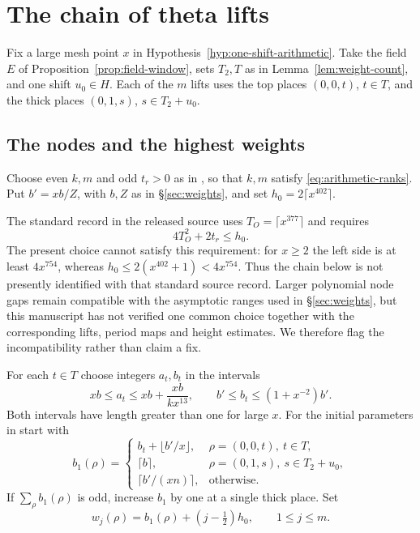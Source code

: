 \section{The chain of theta lifts}\label{sec:theta-chain}

Fix a large mesh point $x$ in Hypothesis~\ref{hyp:one-shift-arithmetic}.
Take the field $E$ of Proposition~\ref{prop:field-window}, sets $T_2,T$
as in Lemma~\ref{lem:weight-count}, and one shift $u_0\in H$.
Each of the $m$ lifts uses the top places $(0,0,t)$,
$t\in T$, and the thick places $(0,1,s)$, $s\in T_2+u_0$.

\subsection{The nodes and the highest weights}

Choose even $k,m$ and odd $t_r>0$ as in
\citep[Proposition~5.15]{adriazola-grh}, so that $k,m$ satisfy
\eqref{eq:arithmetic-ranks}. Put $b'=xb/Z$, with $b,Z$ as in
\S\ref{sec:weights}, and set $h_0=2\lceil x^{402}\rceil$.

\begin{remark}\label{rem:spacing-compatibility}
The standard record in the released source uses
$T_O=\lceil x^{377}\rceil$ and requires
\[
                         4T_O^2+2t_r\le h_0.
\]
The present choice cannot satisfy this requirement: for $x\ge2$ the
left side is at least $4x^{754}$, whereas
$h_0\le2(x^{402}+1)<4x^{754}$. Thus the chain below is not presently
identified with that standard source record. Larger polynomial node
gaps remain compatible with the asymptotic ranges used in
\S\ref{sec:weights}, but this manuscript has not verified one common
choice together with the corresponding lifts, period maps and height
estimates. We therefore flag the incompatibility rather than claim a
fix.
\end{remark}

For each $t\in T$ choose integers $a_t,b_t$ in the intervals
\[
  xb\le a_t\le xb+\frac{xb}{kx^{13}},\qquad
  b'\le b_t\le(1+x^{-2})b'.
\]
Both intervals have length greater than one for large $x$.
For the initial parameters in \citep[Proposition~18.7]{adriazola-grh}
start with
\[
 b_1(\rho)=
 \begin{cases}
 b_t+\lfloor b'/x\rfloor, & \rho=(0,0,t),\ t\in T,\\
 \lceil b\rceil,           & \rho=(0,1,s),\ s\in T_2+u_0,\\
 \lceil b'/(xn)\rceil,    & \text{otherwise}.
 \end{cases}
\]
If $\sum_\rho b_1(\rho)$ is odd, increase $b_1$ by one at a single
thick place. Set
\begin{equation}\label{eq:chain-nodes}
    w_j(\rho)=b_1(\rho)+(j-\tfrac12)h_0,\qquad 1\le j\le m .
\end{equation}

